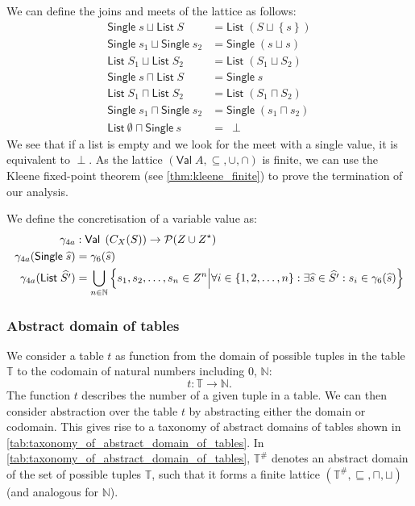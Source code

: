 We can define the joins and meets of the lattice as follows:
\begin{align}
    \mathsf{Single} \; s \sqcup \mathsf{List} \; S &= \mathsf{List} \; (S\sqcup\left\{ s \right\})\\
    \mathsf{Single} \; s_1 \sqcup \mathsf{Single} \; s_2 &= \mathsf{Single} \; (s \sqcup s )\\
    \mathsf{List} \; S_1 \sqcup \mathsf{List} \; S_2 &= \mathsf{List} \; (S_1 \sqcup S_2)\\
    \mathsf{Single} \; s \sqcap \mathsf{List} \; S &= \mathsf{Single} \; s\\
    \mathsf{List} \; S_1 \sqcap \mathsf{List} \; S_2 &= \mathsf{List} \; (S_1 \sqcap S_2)\\
    \mathsf{Single} \; s_1 \sqcap \mathsf{Single} \; s_2 &= \mathsf{Single} \; (s_1 \sqcap s_2)\\
    \mathsf{List} \ \emptyset \sqcap \mathsf{Single} \ s &= \ \perp
\end{align}
We see that if a list is empty and we look for the meet with a single value, it is equivalent to $\perp$.
As the lattice $(\mathsf{Val} \; A, \subseteq, \cup, \cap)$ is finite, we can use the Kleene fixed-point theorem (see \autoref{thm:kleene_finite}) to prove the termination of our analysis.

We define the concretisation of a variable value as:
\begin{align}
    \gamma_{4a} &: \mathsf{Val} \; \left(C_{X}(S)\right) \rightarrow \mathcal{P}(Z \cup Z^\star) \\
    \gamma_{4a}(\mathsf{Single} \; \widehat{s}) &= \gamma_6(\widehat{s}) \\
    \gamma_{4a}(\mathsf{List} \; \widehat{S'}) &= \bigcup_{n \in \mathbb{N}}\left\{s_1, s_2, \dots, s_n \in Z^n \middle| \forall i \in \{1, 2, \dots, n\} : \exists \widehat{s} \in \widehat{S'} : s_i \in \gamma_6(\widehat{s}) \right\}
\end{align}


\subsubsection{Abstract domain of tables}\label{subsubsec:abstract_domain_of_tables}

We consider a table $t$ as function from the domain of possible tuples in the table $\mathbb{T}$ to the codomain of natural numbers including $0$, $\mathbb{N}$:
\begin{equation}
    t : \mathbb{T} \rightarrow \mathbb{N}.
\end{equation}
The function $t$ describes the number of a given tuple in a table.
We can then consider abstraction over the table $t$ by abstracting either the domain or codomain.
This gives rise to a taxonomy of abstract domains of tables shown in \autoref{tab:taxonomy_of_abstract_domain_of_tables}.
In \autoref{tab:taxonomy_of_abstract_domain_of_tables}, $\mathbb{T}^\#$ denotes an abstract domain of the set of possible tuples $\mathbb{T}$, such that it forms a finite lattice $(\mathbb{T}^\#, \sqsubseteq, \sqcap, \sqcup)$ (and analogous for $\mathbb{N}$).


